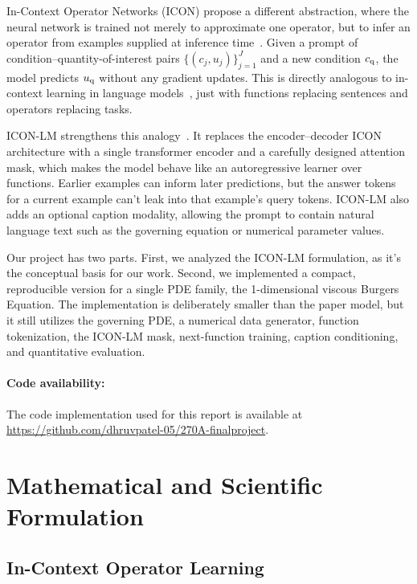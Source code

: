 \documentclass[11pt]{article}
\begin{document}
In-Context Operator Networks (ICON) propose a different abstraction, where the neural
network is trained not merely to approximate one operator, but to infer an
operator from examples supplied at inference time~\citep{yang2023icon}. Given a
prompt of condition--quantity-of-interest pairs
$\{(c_j,u_j)\}_{j=1}^J$ and a new condition $c_{\rm q}$, the model predicts
$u_{\rm q}$ without any gradient updates. This is directly analogous to in-context
learning in language models~\citep{brown2020language}, just with functions replacing
sentences and operators replacing tasks.

ICON-LM strengthens this analogy~\citep{yang2024icon_lm}. It replaces the
encoder--decoder ICON architecture with a single transformer encoder and a
carefully designed attention mask, which makes the model behave like an
autoregressive learner over functions. Earlier examples can inform later
predictions, but the answer tokens for a current example can't leak into that
example's query tokens. ICON-LM also adds an optional caption modality, allowing the prompt
to contain natural language text such as the governing equation or numerical parameter values.

Our project has two parts. First, we analyzed the ICON-LM formulation, as it's
the conceptual basis for our work. Second, we implemented a compact, reproducible
version for a single PDE family, the 1-dimensional
viscous Burgers Equation. The implementation is deliberately smaller than the
paper model, but it still utilizes the governing PDE, a numerical data generator, function tokenization, the
ICON-LM mask, next-function training, caption conditioning, and quantitative
evaluation.

\paragraph{Code availability:} 
The code implementation used for this report is available at \\
\href{https://github.com/dhruvpatel-05/270A-finalproject}{https://github.com/dhruvpatel-05/270A-finalproject}.

\section{Mathematical and Scientific Formulation}
\label{sec:formulation}

\subsection{In-Context Operator Learning}
\end{document}
